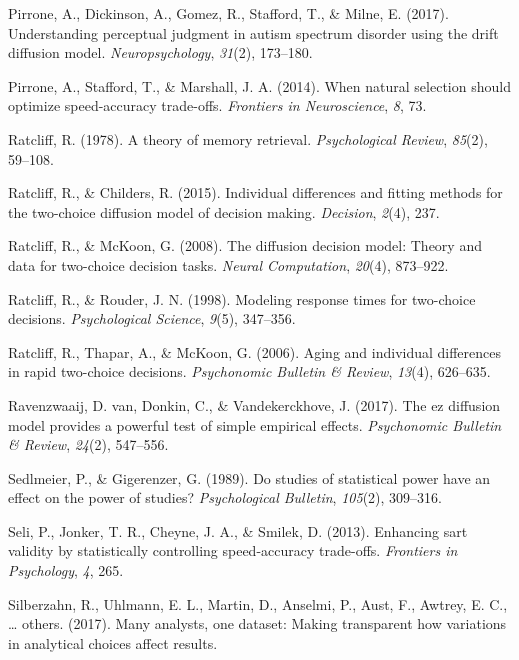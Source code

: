 \documentclass[floatsintext,doc]{apa6}
\theoremstyle{definition}
\theoremstyle{definition}
\theoremstyle{definition}
\theoremstyle{remark}
\begin{document}
\hypertarget{ref-pirrone2017understanding}{}
Pirrone, A., Dickinson, A., Gomez, R., Stafford, T., \& Milne, E.
(2017). Understanding perceptual judgment in autism spectrum disorder
using the drift diffusion model. \emph{Neuropsychology}, \emph{31}(2),
173--180.

\hypertarget{ref-pirrone2014natural}{}
Pirrone, A., Stafford, T., \& Marshall, J. A. (2014). When natural
selection should optimize speed-accuracy trade-offs. \emph{Frontiers in
Neuroscience}, \emph{8}, 73.

\hypertarget{ref-ratcliff1978theory}{}
Ratcliff, R. (1978). A theory of memory retrieval. \emph{Psychological
Review}, \emph{85}(2), 59--108.

\hypertarget{ref-ratcliff2015individual}{}
Ratcliff, R., \& Childers, R. (2015). Individual differences and fitting
methods for the two-choice diffusion model of decision making.
\emph{Decision}, \emph{2}(4), 237.

\hypertarget{ref-ratcliff2008diffusion}{}
Ratcliff, R., \& McKoon, G. (2008). The diffusion decision model: Theory
and data for two-choice decision tasks. \emph{Neural Computation},
\emph{20}(4), 873--922.

\hypertarget{ref-ratcliff1998modeling}{}
Ratcliff, R., \& Rouder, J. N. (1998). Modeling response times for
two-choice decisions. \emph{Psychological Science}, \emph{9}(5),
347--356.

\hypertarget{ref-ratcliff2006aging}{}
Ratcliff, R., Thapar, A., \& McKoon, G. (2006). Aging and individual
differences in rapid two-choice decisions. \emph{Psychonomic Bulletin \&
Review}, \emph{13}(4), 626--635.

\hypertarget{ref-van2017ez}{}
Ravenzwaaij, D. van, Donkin, C., \& Vandekerckhove, J. (2017). The ez
diffusion model provides a powerful test of simple empirical effects.
\emph{Psychonomic Bulletin \& Review}, \emph{24}(2), 547--556.

\hypertarget{ref-sedlmeier1989studies}{}
Sedlmeier, P., \& Gigerenzer, G. (1989). Do studies of statistical power
have an effect on the power of studies? \emph{Psychological Bulletin},
\emph{105}(2), 309--316.

\hypertarget{ref-seli2013enhancing}{}
Seli, P., Jonker, T. R., Cheyne, J. A., \& Smilek, D. (2013). Enhancing
sart validity by statistically controlling speed-accuracy trade-offs.
\emph{Frontiers in Psychology}, \emph{4}, 265.

\hypertarget{ref-silberzahn2017many}{}
Silberzahn, R., Uhlmann, E. L., Martin, D., Anselmi, P., Aust, F.,
Awtrey, E. C., \ldots{} others. (2017). Many analysts, one dataset:
Making transparent how variations in analytical choices affect results.
\end{document}
